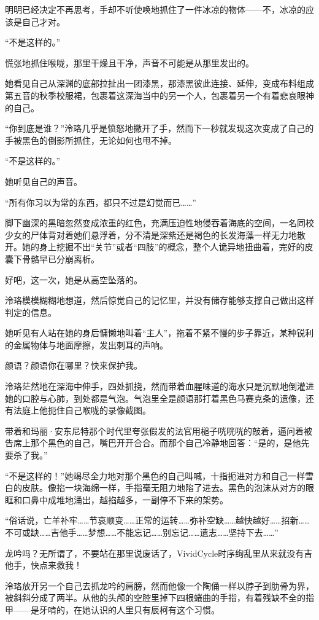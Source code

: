 \documentclass[UTF8, scheme = chinese, openany]{ctexbook}
\begin{document}
明明已经决定不再思考，手却不听使唤地抓住了一件冰凉的物体——不，冰凉的应该是自己才对。

“不是这样的。”

慌张地抓住喉咙，那里干燥且干净，声音不可能是从那里发出的。

她看见自己从深渊的底部拉扯出一团漆黑，那漆黑彼此连接、延伸，变成布料组成第五音的秋季校服裙，包裹着这深海当中的另一个人，包裹着另一个有着悲哀眼神的自己。

“你到底是谁？”泠珞几乎是愤怒地撇开了手，然而下一秒就发现这次变成了自己的手被黑色的倒影所抓住，无论如何也甩不掉。

“不是这样的。”

她听见自己的声音。

“所有你习以为常的东西，都只不过是幻觉而已……”

脚下幽深的黑暗忽然变成浓重的红色，充满压迫性地侵吞着海底的空间，一名同校少女的尸体背对着她们悬浮着，分不清是深紫还是褐色的长发海藻一样无力地散开。她的身上挖掘不出“关节”或者“四肢”的概念，整个人诡异地扭曲着，完好的皮囊下骨骼早已分崩离析。

好吧，这一次，她是从高空坠落的。

泠珞模模糊糊地想道，然后惊觉自己的记忆里，并没有储存能够支撑自己做出这样判定的信息。

她听见有人站在她的身后慵懒地叫着“主人”，拖着不紧不慢的步子靠近，某种锐利的金属物体与地面摩擦，发出刺耳的声响。

颜语？颜语你在哪里？快来保护我。

泠珞茫然地在深海中伸手，四处抓挠，然而带着血腥味道的海水只是沉默地倒灌进她的口腔与心肺，到处都是气泡。气泡里全是颜语那打着黑色马赛克条的遗像，还有法庭上他扼住自己喉咙的录像截图。

带着和玛丽·安东尼特那个时代里夸张假发的法官用槌子咣咣咣的敲着，逼问着被告席上那个黑色的自己，嘴巴开开合合。而那个自己冷静地回答：“是的，是他先要杀了我。”

“不是这样的！”她竭尽全力地对那个黑色的自己叫喊，十指扼进对方和自己一样雪白的皮肤。像掐一块海绵一样，手指毫无阻力地陷了进去。黑色的泡沫从对方的眼眶和口鼻中成堆地涌出，越掐越多，一副停不下来的架势。

“俗话说，亡羊补牢……节哀顺变……正常的运转……弥补空缺……越快越好……招新……不可或缺……吉他手……梦想……不能忘记……别忘记……遗志……坚持下去……”

龙吟吗？无所谓了，不要站在那里说废话了，VividCycle时序绚乱里从来就没有吉他手，快点来救我！

泠珞放开另一个自己去抓龙吟的肩膀，然而他像一个陶俑一样以脖子到肋骨为界，被斜斜分成了两半。从他的头颅的空腔里掉下四根蜷曲的手指，有着残缺不全的指甲——是牙啃的，在她认识的人里只有辰柯有这个习惯。
\end{document}
